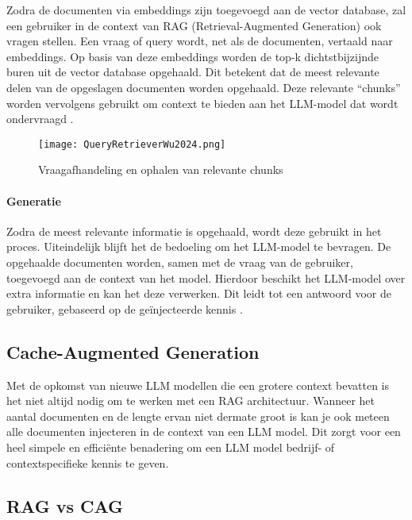     Zodra de documenten via embeddings zijn toegevoegd aan de vector database, zal een gebruiker in de context van RAG (Retrieval-Augmented Generation) ook vragen stellen. Een vraag of query wordt, net als de documenten, vertaald naar embeddings. Op basis van deze embeddings worden de top-k dichtstbijzijnde buren uit de vector database opgehaald. Dit betekent dat de meest relevante delen van de opgeslagen documenten worden opgehaald. Deze relevante “chunks” worden vervolgens gebruikt om context te bieden aan het LLM-model dat wordt ondervraagd \autocite{Wu2024}.
    
            
    \begin{figure}[H]
        \centering
        \texttt{[image: QueryRetrieverWu2024.png]}
        \caption{Vraagafhandeling en ophalen van relevante chunks \cite{Wu2024}}
        \label{fig:RAG bevragen vector database}
    \end{figure}
    
    \paragraph{Generatie}
    
    Zodra de meest relevante informatie is opgehaald, wordt deze gebruikt in het proces. Uiteindelijk blijft het de bedoeling om het LLM-model te bevragen. De opgehaalde documenten worden, samen met de vraag van de gebruiker, toegevoegd aan de context van het model. Hierdoor beschikt het LLM-model over extra informatie en kan het deze verwerken. Dit leidt tot een antwoord voor de gebruiker, gebaseerd op de geïnjecteerde kennis \autocite{Zhao2024}.
    
    \subsection{Cache-Augmented Generation}
    
    Met de opkomst van nieuwe LLM modellen die een grotere context bevatten is het niet altijd nodig om te werken met een RAG architectuur. Wanneer het aantal documenten en de lengte ervan niet dermate groot is kan je ook meteen alle documenten injecteren in de context van een LLM model. Dit zorgt voor een heel simpele en efficiënte benadering om een LLM model bedrijf- of contextspecifieke kennis te geven.
    
    \subsection{RAG vs CAG}
    
